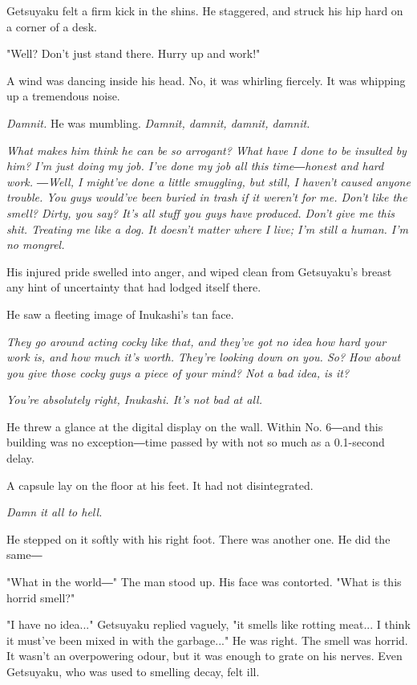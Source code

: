 Getsuyaku felt a firm kick in the shins. He staggered, and struck his
hip hard on a corner of a desk.

"Well? Don't just stand there. Hurry up and work!"

A wind was dancing inside his head. No, it was whirling fiercely. It was
whipping up a tremendous noise.

\emph{Damnit.} He was mumbling. \emph{Damnit, damnit, damnit, damnit.}

\emph{What makes him think he can be so arrogant? What have I done to be
	insulted by him? I'm just doing my job. I've done my job all this
	time―honest and hard work. ―Well, I might've done a little smuggling,
	but still, I haven't caused anyone trouble. You guys would've been
	buried in trash if it weren't for me. Don't like the smell? Dirty, you
	say? It's all stuff you guys have produced. Don't give me this shit.
	Treating me like a dog. It doesn't matter where I live; I'm still a
	human. I'm no mongrel.}

His injured pride swelled into anger, and wiped clean from Getsuyaku's
breast any hint of uncertainty that had lodged itself there.

He saw a fleeting image of Inukashi's tan face.

\emph{They go around acting cocky like that, and they've got no idea how hard
	your work is, and how much it's worth. They're looking down on you. So?
	How about you give those cocky guys a piece of your mind? Not a bad
	idea, is it?}

\emph{You're absolutely right, Inukashi. It's not bad at all.}

He threw a glance at the digital display on the wall. Within No. 6―and
this building was no exception―time passed by with not so much as a
0.1-second delay.

A capsule lay on the floor at his feet. It had not disintegrated.

\emph{Damn it all to hell.}

He stepped on it softly with his right foot. There was another one. He
did the same―

"What in the world―" The man stood up. His face was contorted. "What is
this horrid smell?"

"I have no idea..." Getsuyaku replied vaguely, "it smells like rotting
meat... I think it must've been mixed in with the garbage..." He was
right. The smell was horrid. It wasn't an overpowering odour, but it was
enough to grate on his nerves. Even Getsuyaku, who was used to smelling
decay, felt ill.

